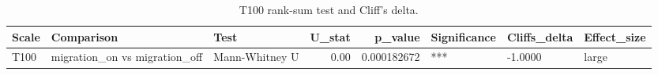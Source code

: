 \begin{table}[htbp]
\centering
\caption{T100 rank-sum test and Cliff's delta.}
\label{tab:t100_wilcoxon_ranksum_cliffs_delta}
\begin{tabular}{lllrrlll}
\toprule
Scale & Comparison & Test & U_stat & p_value & Significance & Cliffs_delta & Effect_size \\
\midrule
T100 & migration_on vs migration_off & Mann-Whitney U & 0.00 & 0.000182672 & *** & -1.0000 & large \\
\bottomrule
\end{tabular}
\end{table}
